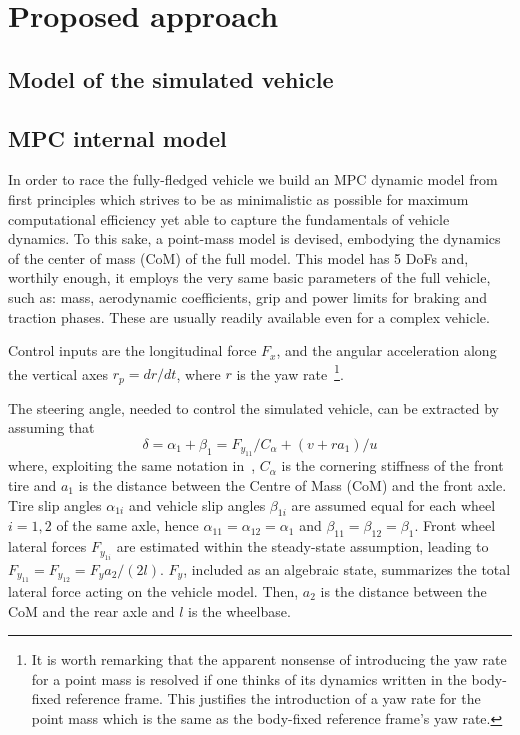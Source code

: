 \documentclass[conference]{IEEEtran} %
\begin{document}

\section{Proposed approach} %


\subsection{Model of the simulated vehicle}


\subsection{MPC internal model}

In order to race the fully-fledged vehicle we build an MPC dynamic model from first principles which strives to be as minimalistic as possible for maximum computational efficiency yet able to capture the fundamentals of vehicle dynamics. To this sake, a point-mass model is devised, embodying the dynamics of the center of mass (CoM) of the full model.
This model has 5 DoFs and, worthily enough, it employs the very same basic parameters of the full vehicle, such as: mass, aerodynamic coefficients, grip and power limits for braking and traction phases. These are usually readily available even for a complex vehicle.

Control inputs are the longitudinal force $F_{x}$, and the angular acceleration along the vertical axes $r_p = dr/dt$, where $r$ is the yaw rate~\footnote{It is worth remarking that the apparent nonsense of introducing the yaw rate for a point mass is resolved if one thinks of its dynamics written in the body-fixed reference frame. This justifies the introduction of a yaw rate for the point mass which is the same as the body-fixed reference frame's yaw rate.}.

The steering angle, needed to control the simulated vehicle, can be extracted by assuming that
\begin{equation}
\delta = \alpha_{1} + \beta_1 = F_{y_{11}}/C_\alpha + (v + ra_1)/u
\end{equation}
where, exploiting the same notation in~\citet{Guiggiani2018}, $C_\alpha$ is the cornering stiffness of the front tire and $a_1$ is the distance between the Centre of Mass (CoM) and the front axle.
Tire slip angles $\alpha_{1i}$ and vehicle slip angles $\beta_{1i}$ are assumed equal for each wheel $i=1, 2$ of the same axle, hence $\alpha_{11} = \alpha_{12} = \alpha_{1}$ and $\beta_{11} = \beta_{12} = \beta_{1}$.
%
Front wheel lateral forces $F_{y_{1i}}$ are estimated within the steady-state assumption, leading to $F_{y_{11}} = F_{y_{12}} = F_{y}a_2/(2l)$.
$F_{y}$, included as an algebraic state, summarizes the total lateral force acting on the vehicle model. Then, $a_2$ is the distance between the CoM and the rear axle and $l$ is the wheelbase.
\end{document}
